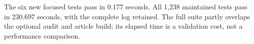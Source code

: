 The six new focused tests pass in 0.177 seconds. All 1,238 maintained tests
pass in 230.697 seconds, with the complete log retained. The full suite partly
overlaps the optional audit and article build; its elapsed time is a validation
cost, not a performance comparison.
